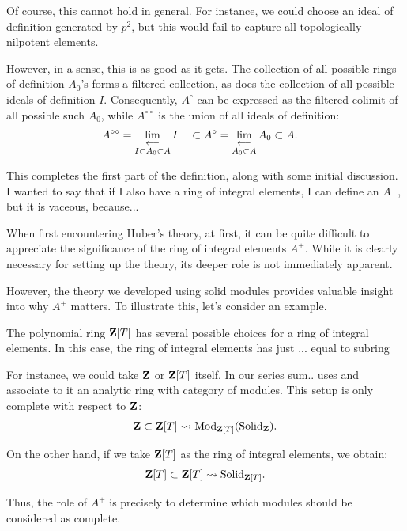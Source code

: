 Of course, this cannot hold in general. For instance, we could choose an ideal of definition generated by $p^2$, but this would fail to capture all topologically nilpotent elements.

However, in a sense, this is as good as it gets. The collection of all possible rings of definition $A_0$'s forms a filtered collection, as does the collection of all possible ideals of definition $I$. Consequently, $A^\circ$ can be expressed as the filtered colimit of all possible such $A_0$, while $A^{\circ\circ}$ is the union of all ideals of definition:
\begin{align*}
A^{\circ\circ} = \mathop{\operatorname*{lim}\limits_{\longleftarrow}}\limits_{I \subset A_0 \subset A} I \quad & \subset A^\circ = \mathop{\operatorname*{lim}\limits_{\longleftarrow}}\limits_{A_0 \subset A} A_0 \subset A.
\end{align*}

This completes the first part of the definition, along with some initial discussion. 
I wanted to say that if I also have a ring of integral elements, I can define an $A^+$, but it is vaceous, because...

When first encountering Huber's theory, at first, it can be quite difficult to appreciate the significance of the ring of integral elements $A^+$. While it is clearly necessary for setting up the theory, its deeper role is not immediately apparent.

However, the theory we developed using solid modules provides valuable insight into why $A^+$ matters.
To illustrate this, let's consider an example.

\bex
The polynomial ring $\mathbf Z[T]$ has several possible choices for a ring of integral elements. In this case, the ring of integral elements has just ... equal to subring 

For instance, we could take $\mathbf Z$ or $\mathbf Z[T]$ itself. In our series sum..  uses and associate to it an analytic ring with category of modules. This setup is only complete with respect to $\mathbf Z$:
\begin{align*}
\mathbf Z \subset \mathbf Z[T] \leadsto \operatorname{Mod}_{\mathbf Z[T]} (\mathrm{Solid}_\mathbf Z).
\end{align*}

On the other hand, if we take $\mathbf Z[T]$ as the ring of integral elements, we obtain:
\begin{align*}
\mathbf Z[T] \subset \mathbf Z[T] \leadsto \mathrm{Solid}_{\mathbf Z[T]}.
\end{align*}

Thus, the role of $A^{+}$ is precisely to determine which modules should be considered as complete.

